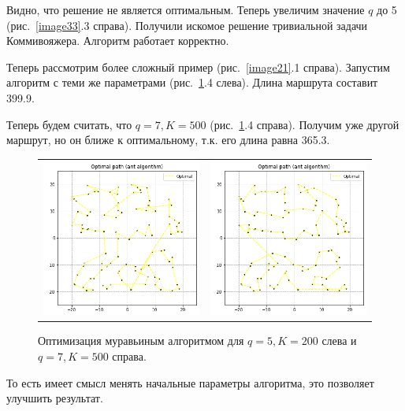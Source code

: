 \documentclass[12pt, a4paper]{article}
\begin{document}
    Видно, что решение не является оптимальным. Теперь увеличим значение $q$ 
    до 5 (рис.~\ref{image33}.3 справа). Получили искомое решение тривиальной 
    задачи Коммивояжера. Алгоритм работает корректно.
    
    Теперь рассмотрим более сложный пример (рис.~\ref{image21}.1 справа). 
    Запустим алгоритм с теми же параметрами (рис.~\ref{image34}.4 слева). 
    Длина маршрута составит 399.9.
    
    Теперь будем считать, что $q = 7, K = 500$ (рис.~\ref{image34}.4 
    справа). Получим уже другой маршрут, но он ближе к оптимальному, т.к. 
    его длина равна 365.3.
    
    \begin{figure}[h!]
        \center
        \begin{tabular}{cc}
            \includegraphics[width = 6cm]{dots2_2_1.png} &
            \includegraphics[width = 6cm]{dots2_2_2.png} \\
        \end{tabular}
        \label{image34}
        \caption{Оптимизация муравьиным алгоритмом для $q = 5, K = 200$ 
            слева и $q = 7, K = 500$ справа.}
    \end{figure}
    
    То есть имеет смысл менять начальные параметры алгоритма, это позволяет 
    улучшить результат.
    
\end{document}
